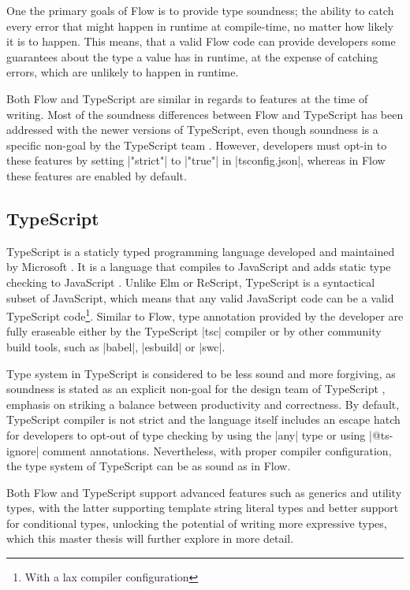 One the primary goals of Flow is to provide type soundness; the ability to catch every error that might happen in runtime at compile-time, no matter how likely it is to happen. This means, that a valid Flow code can provide developers some guarantees about the type a value has in runtime, at the expense of catching errors, which are unlikely to happen in runtime.

Both Flow and TypeScript are similar in regards to features at the time of writing. Most of the soundness differences between Flow and TypeScript has been addressed with the newer versions of TypeScript, even though soundness is a specific non-goal by the TypeScript team \cite{TypeScriptDesignGoals}. However, developers must opt-in to these features by setting \code|"strict"| to \code|"true"| in \code|tsconfig.json|, whereas in Flow these features are enabled by default.

\subsection{TypeScript}

TypeScript is a staticly typed programming language developed and maintained by Microsoft \cite{TypeScriptJavaScriptSyntax}. It is a language that compiles to JavaScript and adds static type checking to JavaScript \cite{DocumentationTypeScriptJavaScript}. Unlike Elm or ReScript, TypeScript is a syntactical subset of JavaScript, which means that any valid JavaScript code can be a valid TypeScript code\footnote{With a lax compiler configuration}. Similar to Flow, type annotation provided by the developer are fully eraseable either by the TypeScript \code|tsc| compiler or by other community build tools, such as \code|babel|\cite{BabelCompilerNext}, \code|esbuild|\cite{EsbuildExtremelyFast} or \code|swc|\cite{SWCRustbasedPlatform}.

Type system in TypeScript is considered to be less sound and more forgiving, as soundness is stated as an explicit non-goal for the design team of TypeScript \cite{TypeScriptDesignGoals}, emphasis on striking a balance between productivity and correctness. By default, TypeScript compiler is not strict and the language itself includes an escape hatch for developers to opt-out of type checking by using the \code|any| type or using \code|@ts-ignore| comment annotations. Nevertheless, with proper compiler configuration, the type system of TypeScript can be as sound as in Flow.

Both Flow and TypeScript support advanced features such as generics and utility types, with the latter supporting template string literal types and better support for conditional types, unlocking the potential of writing more expressive types, which this master thesis will further explore in more detail.

